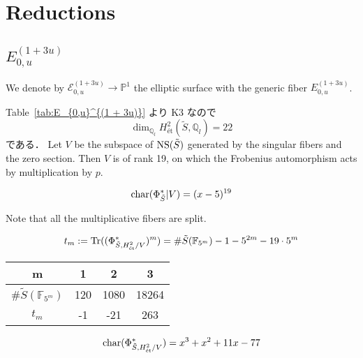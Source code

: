 \documentclass[main]{subfiles}
\begin{document}
\chapter{Reductions}
\label{chap:reduction}

\section{$E_{0,u}^{(1 + 3u)}$}
We denote by $\mathcal{E}_{0,u}^{(1 + 3u)} \to \mathbb{P}^1$ the elliptic surface with the generic fiber $E_{0,u}^{(1 + 3u)}$.

Table~\ref{tab:E_{0,u}^{(1 + 3u)}} より K3 なので
\begin{equation}
    \dim_{\mathbb{Q}_{l}} H_{\text{\'et}}^{2}(\tilde{S}, \mathbb{Q}_{l}) = 22
\end{equation}
である．
Let $V$ be the subspace of $\operatorname{NS}(\tilde{S})$ generated by the singular fibers and the zero section.
Then $V$ is of rank 19, on which the Frobenius automorphism acts by multiplication by $p$.

\begin{equation}
    \operatorname{char} (\Phi_{\tilde{S}}^{*} | V) = (x - 5)^{19}
\end{equation}

Note that all the multiplicative fibers are split.

\begin{equation}
    t_{m} := \operatorname{Tr}((\Phi_{\tilde{S},H_{\text{\'et}}^{2} / V}^{*})^{m}) = \# \tilde{S}(\mathbb{F}_{5^{m}}) - 1 - 5^{2m} - 19 \cdot 5^{m}
\end{equation}

\begin{table}[h]
    \centering
    \begin{tabular}{|c|c|c|c|}
        \hline
        m                                & 1   & 2    & 3     \\
        \hline
        $\# \tilde{S}(\mathbb{F}_{5^m})$ & 120 & 1080 & 18264 \\
        \hline
        $t_m$                            & -1  & -21  & 263   \\
        \hline
    \end{tabular}
    \label{tab:sample}
\end{table}

\begin{equation}
    \operatorname{char}(\Phi_{\tilde{S},H_{\text{\'et}}^{2} / V}^{*}) = x^{3} + x^{2} + 11 x - 77
\end{equation}
\end{document}
